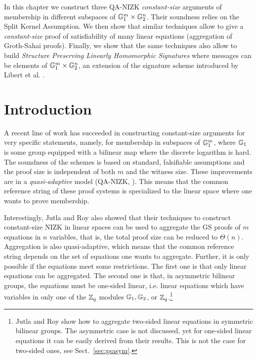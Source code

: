 
In this chapter we construct three QA-NIZK \emph{constant-size} arguments of membership in different subspaces of $\mathbb{G}^{m}_1 \times \mathbb{G}^{n}_2$. Their soundness relies on the Split Kernel Assumption. We then show that similar techniques allow to give a \emph{constant-size} proof of satisfiability of many linear equations (aggregation of Groth-Sahai proofs). Finally, we show that the same techniques also allow to build \emph{Structure Preserving Linearly Homomorphic Signatures} where messages can be elements of $\mathbb{G}_1^m\times\mathbb{G}_2^n$, an extension of the signature scheme introduced by Libert et al. \cite{C:LPJY13}. 
\section{Introduction}
A recent line of work 
  \cite{AC:JutRoy13,C:JutRoy14,EC:KilWee15,EC:LPJY14} 
has succeeded in constructing constant-size  
  arguments for very specific statements, namely, for membership in subspaces of $\mathbb{G}_1^{m}$, 
  where $\mathbb{G}_1$ is some group equipped with a bilinear map where the discrete logarithm is hard. 
The soundness of the schemes is based on standard, falsifiable assumptions 
  and the proof size is independent of both $m$ and the witness size.  These improvements are in a  \textit{quasi-adaptive} 
  model (QA-NIZK, \cite{AC:JutRoy13}).  This means that the common reference string of these proof systems is 
  specialized to the linear space where one wants to prove membership.
  
Interestingly, Jutla and Roy  \cite{C:JutRoy14} also showed that their techniques to construct 
  constant-size NIZK in linear spaces can be used to aggregate the GS proofs of $m$ equations in $n$ variables, that is,  the total proof size can be reduced to $\Theta(n)$.  Aggregation is also quasi-adaptive, 
which means that the common reference string depends on the set of equations one wants to aggregate.   Further, it is only possible if the equations meet some restrictions. The first one is that only linear equations can be aggregated. The second one is that, in asymmetric bilinear groups, the equations must be one-sided linear, i.e. linear equations 
  which have variables in only one of the $\mathbb{Z}_q$ modules $\mathbb{G}_1,\mathbb{G}_2$, 
  or $\mathbb{Z}_q$.\footnote{Jutla and Roy show how to aggregate two-sided linear equations in
  symmetric bilinear groups. The asymmetric case is not discussed, 
  yet for one-sided linear equations it can be easily  derived from
  their results. 
  This is not the case for two-sided ones, see Sect.\ \ref{sec:gsasym}.} 


